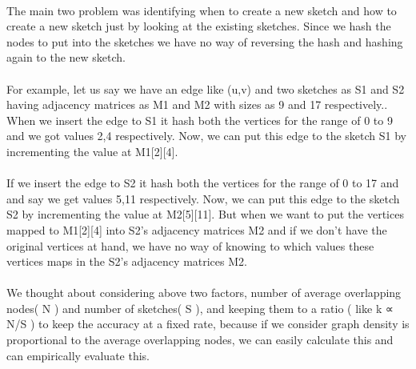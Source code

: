 \documentclass[12pt]{report}
\numberwithin{figure}{section}
\numberwithin{table}{section}
\begin{document}
\paragraph{}

The main two problem was identifying when to create a new sketch and how to create a new sketch just by looking at the existing sketches. Since we hash the nodes to put into the sketches we have no way of reversing the hash and hashing again to the new sketch.

\paragraph{}

For example, let us say we have an edge like (u,v) and two sketches as S1 and S2 having adjacency matrices as M1 and M2 with sizes as 9 and 17 respectively.. When we insert the edge to S1 it hash both the vertices for the range of 0 to 9 and we got values 2,4 respectively. Now, we can put this edge to the sketch S1  by incrementing the value at M1[2][4]. 

\paragraph{}

If we insert the edge to S2 it hash both the vertices for the range of 0 to 17 and and say we get values 5,11 respectively. Now, we can put this edge to the sketch S2  by incrementing the value at M2[5][11]. But when we want to put the vertices mapped to M1[2][4] into S2’s adjacency matrices M2 and if we don’t have the original vertices at hand, we have no way of knowing  to which values these vertices maps in the S2’s adjacency matrices M2.

\paragraph{}

We thought about considering above two factors, number of average overlapping nodes( N ) and number of sketches( S ), and keeping them to a ratio ( like  k  ∝ N/S ) to keep the accuracy at a fixed rate, because if we consider graph density is proportional to the average overlapping nodes, we can easily calculate this and can empirically evaluate this.

\paragraph{}
\end{document}
